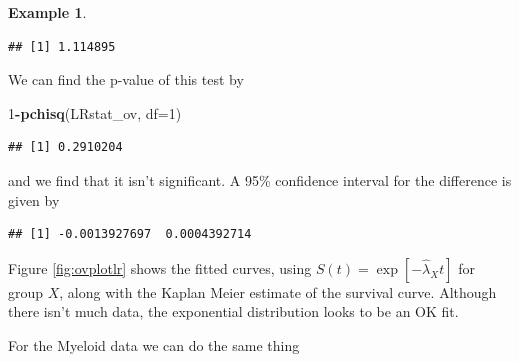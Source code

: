\documentclass[
  openany]{book}
\newenvironment{Shaded}{\begin{snugshade}}{\end{snugshade}}
\newcommand{\AttributeTok}[1]{\textcolor[rgb]{0.13,0.29,0.53}{#1}}
\newcommand{\DecValTok}[1]{\textcolor[rgb]{0.00,0.00,0.81}{#1}}
\newcommand{\FunctionTok}[1]{\textcolor[rgb]{0.13,0.29,0.53}{\textbf{#1}}}
\newcommand{\NormalTok}[1]{#1}
\newcommand{\OtherTok}[1]{\textcolor[rgb]{0.56,0.35,0.01}{#1}}
\newcommand{\SpecialCharTok}[1]{\textcolor[rgb]{0.81,0.36,0.00}{\textbf{#1}}}
\newcommand{\StringTok}[1]{\textcolor[rgb]{0.31,0.60,0.02}{#1}}
\theoremstyle{definition}
\theoremstyle{definition}
\newtheorem{example}{Example}[chapter]
\theoremstyle{definition}
\theoremstyle{definition}
\theoremstyle{remark}
\begin{document}
\begin{example}
\begin{verbatim}
## [1] 1.114895
\end{verbatim}

We can find the p-value of this test by

\begin{Shaded}
\begin{Highlighting}[]
\DecValTok{1}\SpecialCharTok{{-}}\FunctionTok{pchisq}\NormalTok{(LRstat\_ov, }\AttributeTok{df=}\DecValTok{1}\NormalTok{)}
\end{Highlighting}
\end{Shaded}

\begin{verbatim}
## [1] 0.2910204
\end{verbatim}

and we find that it isn't significant. A 95\% confidence interval for the difference is given by

\begin{verbatim}
## [1] -0.0013927697  0.0004392714
\end{verbatim}

Figure \ref{fig:ovplotlr} shows the fitted curves, using \(S\left(t\right)=\exp\left[-\hat{\lambda}_Xt\right]\) for group \(X\), along with the Kaplan Meier estimate of the survival curve. Although there isn't much data, the exponential distribution looks to be an OK fit.

For the Myeloid data we can do the same thing

\begin{Shaded}
\end{Shaded}
\end{example}
\end{document}
